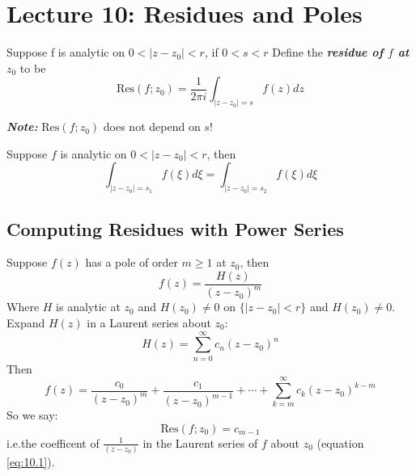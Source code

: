 \chapter{Lecture 10: Residues and Poles} %

\begin{definition}
    [Residue]
    Suppose f is analytic on $0 < |z - z_0| < r$, if $0 < s < r$ Define the \textbf{\textit{residue of $f$ at $z_0$}} to be
    $$\text{Res}(f;z_0) = \frac{1}{2\pi i} \int_{|z - z_0| = s} f(z) dz$$
\end{definition}

\begin{remark}
    \textbf{\textit{Note:}} $\text{Res}(f; z_0)$ does not depend on $s$!
\end{remark}

\begin{theorem}
     Suppose $f$ is analytic on $0 < |z - z_0| < r$, then
    $$\int_{|z - z_0| = s_1}f(\xi) d\xi = \int_{|z - z_0| = s_2}f(\xi) d\xi$$
\end{theorem}

\section{Computing Residues with Power Series}

\begin{theorem}

    Suppose $f(z)$ has a pole of order $m \geq 1 $ at $z_0$, then
    \begin{equation}
        f(z) = \frac{H(z)}{(z - z_0)^m}
    \end{equation}
    Where $H$ is analytic at $z_0$ and $H(z_0) \neq 0$ on $\{|z-z_0| < r\}$ and $H(z_0) \neq 0$.
    Expand $H(z)$ in a Laurent series about $z_0$:
    $$H(z) = \sum_{n=0}^{\infty} c_n(z - z_0)^n$$
    Then
    \begin{equation}
        \boxed{f(z) = \frac{c_0}{(z - z_0)^m} + \frac{c_1}{(z - z_0)^{m-1}} + \cdots + \sum_{k=m}^{\infty} c_k(z - z_0)^{k-m}}
        \label{eq:10.1}
    \end{equation}
    So we say:
    \begin{equation*}
        \text{Res}(f; z_0) = c_{m-1}
    \end{equation*}
    i.e.the coefficent of $\frac{1}{(z - z_0)}$ in the Laurent series of $f$ about $z_0$ (equation \ref{eq:10.1}).
\end{theorem}

